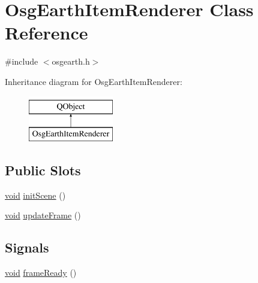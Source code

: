 \hypertarget{class_osg_earth_item_renderer}{\section{Osg\-Earth\-Item\-Renderer Class Reference}
\label{class_osg_earth_item_renderer}
}


{\ttfamily \#include $<$osgearth.\-h$>$}

Inheritance diagram for Osg\-Earth\-Item\-Renderer\-:\begin{figure}[H]
\begin{center}
\leavevmode
\includegraphics[height=2.000000cm]{class_osg_earth_item_renderer}
\end{center}
\end{figure}
\subsection*{Public Slots}
\begin{DoxyCompactItemize}
\item 
\hyperlink{group___u_a_v_objects_plugin_ga444cf2ff3f0ecbe028adce838d373f5c}{void} \hyperlink{class_osg_earth_item_renderer_a2f761da4a4416337b6ef107b07dc211a}{init\-Scene} ()
\item 
\hyperlink{group___u_a_v_objects_plugin_ga444cf2ff3f0ecbe028adce838d373f5c}{void} \hyperlink{class_osg_earth_item_renderer_a5e3695b2241bc4dd17066706ae9e6ed5}{update\-Frame} ()
\end{DoxyCompactItemize}
\subsection*{Signals}
\begin{DoxyCompactItemize}
\item 
\hyperlink{group___u_a_v_objects_plugin_ga444cf2ff3f0ecbe028adce838d373f5c}{void} \hyperlink{class_osg_earth_item_renderer_a75e132a88d250808260ba670b734ec99}{frame\-Ready} ()
\end{DoxyCompactItemize}
